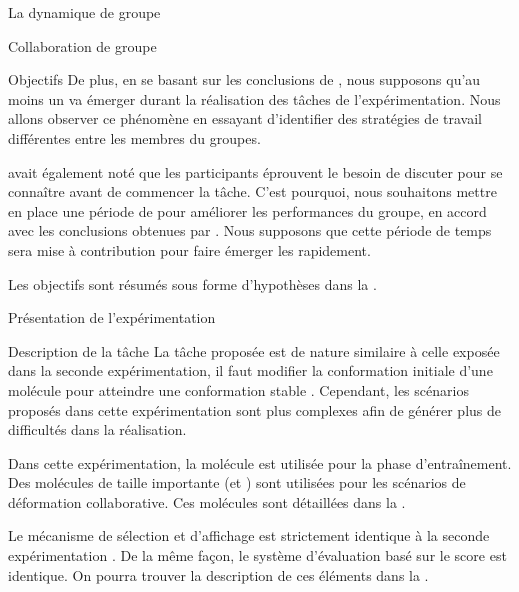 \documentclass[myfrancais,ngerman,english,french]{mythesis}
\begin{document}
\begin{mychapter}{La dynamique de groupe}
\begin{mysection}{Collaboration de groupe}
\begin{mysubsection}{Objectifs}
				De plus, en se basant sur les conclusions de , nous supposons qu'au moins un  va émerger durant la réalisation des tâches de l'expérimentation.
				Nous allons observer ce phénomène en essayant d'identifier des stratégies de travail différentes entre les membres du groupes.

				 avait également noté que les participants éprouvent le besoin de discuter pour se connaître avant de commencer la tâche.
				C'est pourquoi, nous souhaitons mettre en place une période de \mybrainstorming pour améliorer les performances du groupe, en accord avec les conclusions obtenues par .
				Nous supposons que cette période de temps sera mise à contribution pour faire émerger les  rapidement.

				Les objectifs sont résumés sous forme d'hypothèses dans la .
			\end{mysubsection}
		\end{mysection}
		\begin{mysection}{Présentation de l'expérimentation}
			\begin{mysubsection}{Description de la tâche}
				La tâche proposée est de nature similaire à celle exposée dans la seconde expérimentation, il faut modifier la conformation initiale d'une molécule pour atteindre une conformation stable .
				Cependant, les scénarios proposés dans cette expérimentation sont plus complexes afin de générer plus de difficultés dans la réalisation.

				Dans cette expérimentation, la molécule \myTRPCAGE est utilisée pour la phase d'entraînement.
				Des molécules de taille importante (\myPrion et \myUbiquitin) sont utilisées pour les scénarios de déformation collaborative.
				Ces molécules sont détaillées dans la .

				Le mécanisme de sélection et d'affichage est strictement identique à la seconde expérimentation .
				De la même façon, le système d'évaluation basé sur le score  est identique.
				On pourra trouver la description de ces éléments dans la .


\end{mysubsection}
\end{mysection}
\end{mychapter}
\end{document}
